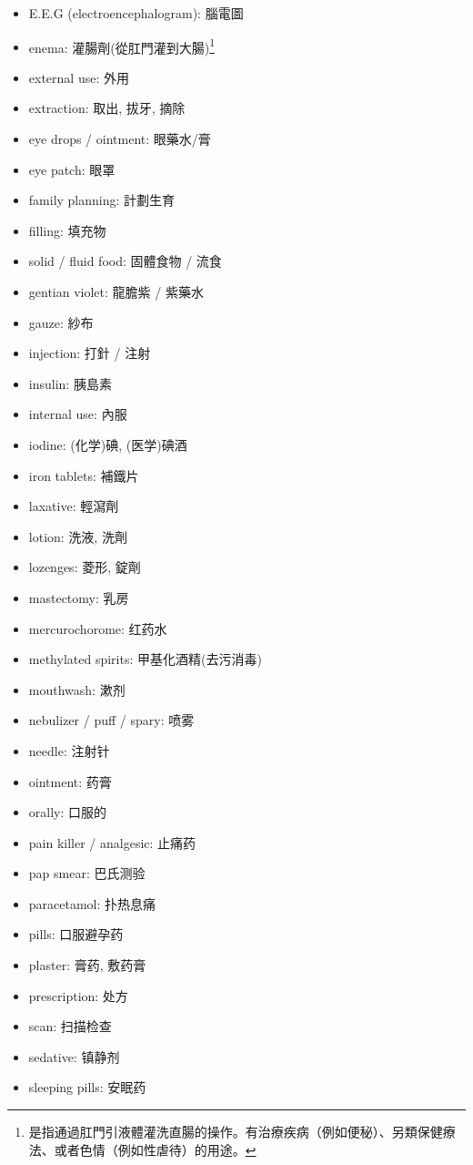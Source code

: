 \begin{multicols}{2}
\begin{itemize}
  \item E.E.G (electroencephalogram): 腦電圖
  \item enema: 灌腸劑(從肛門灌到大腸)\footnote{是指通過肛門引液體灌洗直腸的操作。有治療疾病（例如便秘）、另類保健療法、或者色情（例如性虐待）的用途。}
  \item external use: 外用
  \item extraction: 取出, 拔牙, 摘除
  \item eye drops / ointment: 眼藥水/膏
  \item eye patch: 眼罩
  \item family planning: 計劃生育
  \item filling: 填充物
  \item solid / fluid food: 固體食物 / 流食
  \item gentian violet: 龍膽紫 / 紫藥水
  \item gauze: 紗布
  \item injection: 打針 / 注射
  \item insulin: 胰島素
  \item internal use: 內服
  \item iodine: (化学)碘, (医学)碘酒
  \item iron tablets: 補鐵片
  \item laxative: 輕瀉劑
  \item lotion: 洗液, 洗劑
  \item lozenges: 菱形, 錠劑
  \item mastectomy: 乳房
  \item mercurochorome: 红药水
  \item methylated spirits: 甲基化酒精(去污消毒)
  \item mouthwash: 漱剂
  \item nebulizer / puff / spary: 喷雾
  \item needle: 注射针
  \item ointment: 药膏
  \item orally: 口服的
  \item pain killer / analgesic: 止痛药
  \item pap smear: 巴氏测验
  \item paracetamol: 扑热息痛
  \item pills: 口服避孕药
  \item plaster: 膏药, 敷药膏
  \item prescription: 处方
  \item scan: 扫描检查
  \item sedative: 镇静剂
  \item sleeping pills: 安眠药

\end{itemize}
\end{multicols}
